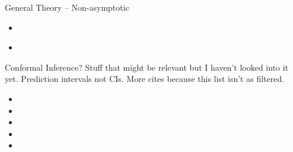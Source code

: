 \documentclass[aspectratio=169, professionalfonts]{beamer}
\begin{document}
\begin{frame}{General Theory -- Non-asymptotic}
	\vfill
	\begin{itemize}
		\item \cite{waudby-smith2022Anytimevalid}
		      \vfill

		      \item\cite{howard2021Timeuniform}
	\end{itemize}
	\vfill

\end{frame}
\begin{frame}{Conformal Inference?}
	Stuff that might be relevant but I haven't looked into it yet.
	Prediction intervals not CIs. More cites because this list isn't
	as filtered.
	\begin{itemize}
		\item {}
		      \vfill
		\item {}
		      \vfill
		\item {}
		      \vfill
		\item {}
		      \vfill
		\item {}
		      \vfill
	\end{itemize}
\end{frame}



\appendix
\printbibliography
\end{document}
